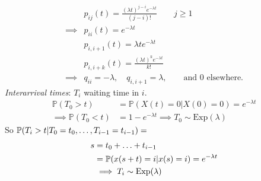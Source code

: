\documentclass{article}
\begin{document}
	\begin{example}
		\begin{align*}
			&p_{ij}(t)=\frac{(\lambda t)^{j-i}e^{-\lambda t}}{(j-i)!}\qquad j\geqslant 1\\
			\implies &p_{ii}(t)=e^{-\lambda t}\\
			&p_{i,i+1}(t)=\lambda t e^{-\lambda t}\\
			&p_{i,i+k}(t)=\frac{(\lambda t)^{k}e^{-\lambda t}}{k!}\\
			\implies &q_{ii}=-\lambda,\quad q_{i,i+1}=\lambda,\qquad\text{and 0 elsewhere.}
		\end{align*}
		\textit{Interarrival times}: $T_i$ waiting time in $i$.
		\begin{align*}
			\mathbb{P}(T_0 > t) &= \mathbb{P}(X(t) = 0|X(0) = 0) = e^{- \lambda t}\\
			\implies \mathbb{P}(T_0 < t) &= 1-e^{-\lambda t} \implies T_0 \sim \text{Exp}(\lambda)
		\end{align*}
		So $\mathbb{P}(T_i>t|T_0=t_0,\ldots,T_{i-1}=t_{i-1})=$
		\begin{align*}
			s &= t_0+\ldots+t_{i-1}\\
			&=\mathbb{P}(x(s+t)=i|x(s)=i)=e^{-\lambda t}\\
			&\implies T_i\sim\text{Exp}(\lambda)
		\end{align*}
	\end{example}
\end{document}

